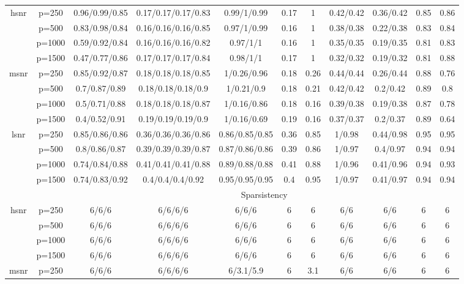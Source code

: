 \begin{table}[ht]
{\begin{tabular}{|c|c|ccccccccc|}
\midrule\multirow{4}[2]{*}{hsnr} & p=250 & 0.96/0.99/0.85 & 0.17/0.17/0.17/0.83 & 0.99/1/0.99 & 0.17 & 1 & 0.42/0.42 & 0.36/0.42 & 0.85 & 0.86 \\ 
   & p=500 & 0.83/0.98/0.84 & 0.16/0.16/0.16/0.85 & 0.97/1/0.99 & 0.16 & 1 & 0.38/0.38 & 0.22/0.38 & 0.83 & 0.84 \\ 
   & p=1000 & 0.59/0.92/0.84 & 0.16/0.16/0.16/0.82 & 0.97/1/1 & 0.16 & 1 & 0.35/0.35 & 0.19/0.35 & 0.81 & 0.83 \\ 
   & p=1500 & 0.47/0.77/0.86 & 0.17/0.17/0.17/0.84 & 0.98/1/1 & 0.17 & 1 & 0.32/0.32 & 0.19/0.32 & 0.81 & 0.88 \\ 
  \midrule\multirow{4}[2]{*}{msnr} & p=250 & 0.85/0.92/0.87 & 0.18/0.18/0.18/0.85 & 1/0.26/0.96 & 0.18 & 0.26 & 0.44/0.44 & 0.26/0.44 & 0.88 & 0.76 \\ 
   & p=500 & 0.7/0.87/0.89 & 0.18/0.18/0.18/0.9 & 1/0.21/0.9 & 0.18 & 0.21 & 0.42/0.42 & 0.2/0.42 & 0.89 & 0.8 \\ 
   & p=1000 & 0.5/0.71/0.88 & 0.18/0.18/0.18/0.87 & 1/0.16/0.86 & 0.18 & 0.16 & 0.39/0.38 & 0.19/0.38 & 0.87 & 0.78 \\ 
   & p=1500 & 0.4/0.52/0.91 & 0.19/0.19/0.19/0.9 & 1/0.16/0.69 & 0.19 & 0.16 & 0.37/0.37 & 0.2/0.37 & 0.89 & 0.64 \\ 
  \midrule\multirow{4}[2]{*}{lsnr} & p=250 & 0.85/0.86/0.86 & 0.36/0.36/0.36/0.86 & 0.86/0.85/0.85 & 0.36 & 0.85 & 1/0.98 & 0.44/0.98 & 0.95 & 0.95 \\ 
   & p=500 & 0.8/0.86/0.87 & 0.39/0.39/0.39/0.87 & 0.87/0.86/0.86 & 0.39 & 0.86 & 1/0.97 & 0.4/0.97 & 0.94 & 0.94 \\ 
   & p=1000 & 0.74/0.84/0.88 & 0.41/0.41/0.41/0.88 & 0.89/0.88/0.88 & 0.41 & 0.88 & 1/0.96 & 0.41/0.96 & 0.94 & 0.93 \\ 
   & p=1500 & 0.74/0.83/0.92 & 0.4/0.4/0.4/0.92 & 0.95/0.95/0.95 & 0.4 & 0.95 & 1/0.97 & 0.41/0.97 & 0.94 & 0.94 \\ 
   \midrule 
 \multicolumn{1}{|c}{} &       & \multicolumn{9}{c|}{Sparsistency} \\
\midrule\multirow{4}[2]{*}{hsnr} & p=250 & 6/6/6 & 6/6/6/6 & 6/6/6 & 6 & 6 & 6/6 & 6/6 & 6 & 6 \\ 
   & p=500 & 6/6/6 & 6/6/6/6 & 6/6/6 & 6 & 6 & 6/6 & 6/6 & 6 & 6 \\ 
   & p=1000 & 6/6/6 & 6/6/6/6 & 6/6/6 & 6 & 6 & 6/6 & 6/6 & 6 & 6 \\ 
   & p=1500 & 6/6/6 & 6/6/6/6 & 6/6/6 & 6 & 6 & 6/6 & 6/6 & 6 & 6 \\ 
  \midrule\multirow{4}[2]{*}{msnr} & p=250 & 6/6/6 & 6/6/6/6 & 6/3.1/5.9 & 6 & 3.1 & 6/6 & 6/6 & 6 & 6 \\ 

\end{tabular}}
\end{table}
